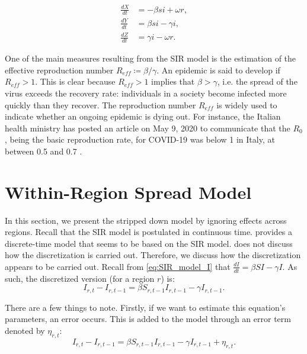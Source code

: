 \documentclass[12pt]{article}
\begin{document}
	\begin{align}
    	\frac{dX}{dt} &= -\beta si + \omega r, \label{eq:SIR_model_X}\\
    	\frac{dY}{dt} &= \beta si - \gamma i, \label{eq:SIR_model_Y}\\
    	\frac{dZ}{dt} &= \gamma i - \omega r. \label{eq:SIR_model_Z}
	\end{align}
	
	One of the main measures resulting from the SIR model is the estimation of the effective reproduction number $R_{eff} \coloneqq \beta / \gamma$. An epidemic is said to develop if $R_{eff} > 1$. This is clear because $R_{eff} > 1$ implies that $\beta > \gamma$, i.e. the spread of the virus exceeds the recovery rate: individuals in a society become infected more quickly than they recover. The reproduction number $R_{eff}$ is widely used to indicate whether an ongoing epidemic is dying out. For instance, the Italian health ministry has posted an article on May 9, 2020 to communicate that the $R_0$, being the basic reproduction rate, for COVID-19 was below 1 in Italy, at between 0.5 and 0.7 \parencite{saluteR0}.
	
	\section{Within-Region Spread Model} \label{sec:model_within}
	In this section, we present the stripped down model by \textcite{adda2016economic} ignoring effects across regions. Recall that the SIR model is postulated in continuous time. \textcite{adda2016economic} provides a discrete-time model that seems to be based on the SIR model. \textcite{adda2016economic} does not discuss how the discretization is carried out. Therefore, we discuss how the discretization appears to be carried out. Recall from \eqref{eq:SIR_model_I} that $\frac{dI}{dt} = \beta SI - \gamma I$. As such, the discretized version (for a region $r$) is:
	    \begin{equation}\label{eq:discretized_sir}
	        I_{r,t} - I_{r,t-1} = \beta S_{r,t-1}I_{r,t-1} - \gamma I_{r,t-1}.
	    \end{equation}
	   
	There are a few things to note. Firstly, if we want to estimate this equation's parameters, an error occurs. This is added to the model through an error term denoted by $\eta_{r,t}$:
	    \begin{equation}\label{eq:discretized_sir_error}
	        I_{r,t} - I_{r,t-1} = \beta S_{r,t-1}I_{r,t-1} - \gamma I_{r,t-1} + \eta_{r,t}.
	    \end{equation}
	
\end{document}
